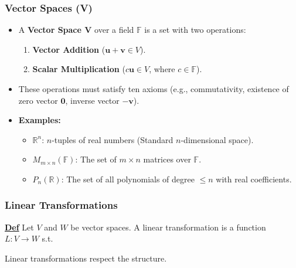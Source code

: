 \documentclass[aspectratio=169,xcolor=dvipsnames,svgnames,x11names,fleqn]{beamer}
\begin{document}
\begin{frame}
\frametitle{Vector Spaces (V)}
\begin{itemize}
    \item A \textbf{Vector Space V} over a field $\mathbb{F}$ is a set with two operations:
    \begin{enumerate}
        \item \textbf{Vector Addition} ($\mathbf{u} + \mathbf{v} \in V$).
        \item \textbf{Scalar Multiplication} ($c \mathbf{u} \in V$, where $c \in \mathbb{F}$).
    \end{enumerate}
    \item These operations must satisfy ten axioms (e.g., commutativity, existence of zero vector $\mathbf{0}$, inverse vector $-\mathbf{v}$).
    \item \textbf{Examples:}
    \begin{itemize}
        \item $\mathbb{R}^n$: $n$-tuples of real numbers (Standard $n$-dimensional space).
        \item $M_{m \times n}(\mathbb{F})$: The set of $m \times n$ matrices over $\mathbb{F}$.
        \item $P_n(\mathbb{R})$: The set of all polynomials of degree $\leq n$ with real coefficients.
    \end{itemize}
\end{itemize}
\end{frame}

\begin{frame}
\frametitle{Linear Transformations}
\underline{\textbf{Def}} Let $V$ and $W$ be vector spaces. A \textcolor{androidRed}{linear transformation} is a function $L: V \to W$ s.t.

\vspace{0.5cm}
\begin{center}
\end{center}

\vspace{0.5cm}
Linear transformations respect the structure.
\end{frame}
\end{document}
